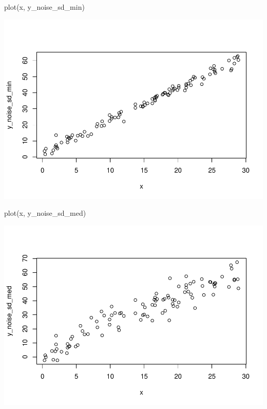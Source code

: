 \documentclass[
]{book}
\newenvironment{Shaded}{\begin{snugshade}}{\end{snugshade}}
\newcommand{\FunctionTok}[1]{\textcolor[rgb]{0.00,0.00,0.00}{#1}}
\newcommand{\NormalTok}[1]{#1}
\begin{document}
\begin{Shaded}
\begin{Highlighting}[]
\FunctionTok{plot}\NormalTok{(x, y\_noise\_sd\_min)}
\end{Highlighting}
\end{Shaded}

\includegraphics{test_course_notes_files/figure-latex/remedy006-2.pdf}

\begin{Shaded}
\begin{Highlighting}[]
\FunctionTok{plot}\NormalTok{(x, y\_noise\_sd\_med)}
\end{Highlighting}
\end{Shaded}

\includegraphics{test_course_notes_files/figure-latex/remedy006-3.pdf}
\end{document}
